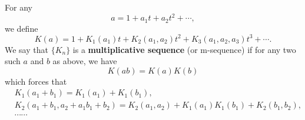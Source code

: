For any 
\begin{equation*}
    a = 1 + a_1t + a_2t^2 + \cdots, 
\end{equation*}
we define
\begin{equation*}
    K(a) = 1 + K_1(a_1)t + K_2(a_1,a_2)t^2 + K_3(a_1,a_2,a_3)t^3 + \cdots.
\end{equation*}
We say that $\{K_n\}$ is a \textbf{multiplicative sequence} (or m-sequence) if for any two such $a$ and $b$ as above, we have 
\begin{equation*}
    K(ab) = K(a)K(b) 
\end{equation*}
which forces that
\begin{align*}
    &K_1(a_1+b_1) = K_1(a_1) + K_1(b_1), \\
    &K_2(a_1+b_1,a_2+a_1b_1+b_2) = K_2(a_1,a_2) + K_1(a_1)K_1(b_1) + K_2(b_1,b_2), \\
    &\cdots\cdots
\end{align*}

